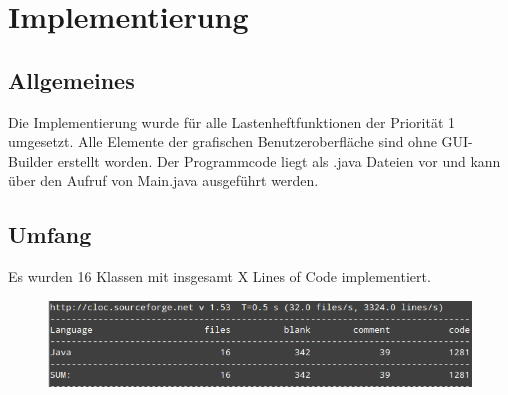 \clearpage

\chapter{Implementierung}

\section{Allgemeines}
Die Implementierung wurde für alle Lastenheftfunktionen der Priorität 1 umgesetzt. Alle Elemente der grafischen Benutzeroberfläche sind ohne GUI-Builder erstellt worden. Der Programmcode liegt als .java Dateien vor und kann über den Aufruf von Main.java ausgeführt werden.

\section{Umfang}
Es wurden 16 Klassen mit insgesamt X Lines of Code implementiert.

\begin{figure}[!h]
	\centering
    \includegraphics[width=\textwidth]{./cloc.png}
	\label{layout_gesamt}
\end{figure}



\section{}


